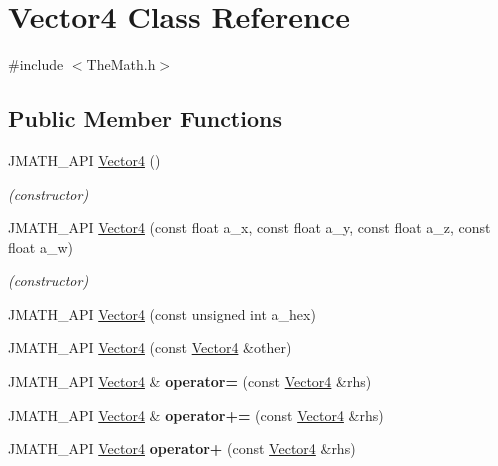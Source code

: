 \hypertarget{class_vector4}{\section{Vector4 Class Reference}
\label{class_vector4}
}


{\ttfamily \#include $<$The\+Math.\+h$>$}

\subsection*{Public Member Functions}
\begin{DoxyCompactItemize}
\item 
J\+M\+A\+T\+H\+\_\+\+A\+P\+I \hyperlink{class_vector4_a511b4d9c8326c235b76d794eea018921}{Vector4} ()
\begin{DoxyCompactList}\small\item\em (constructor) \end{DoxyCompactList}\item 
J\+M\+A\+T\+H\+\_\+\+A\+P\+I \hyperlink{class_vector4_a56a3f858547873f05b8fed5cf58f3c85}{Vector4} (const float a\+\_\+x, const float a\+\_\+y, const float a\+\_\+z, const float a\+\_\+w)
\begin{DoxyCompactList}\small\item\em (constructor) \end{DoxyCompactList}\item 
J\+M\+A\+T\+H\+\_\+\+A\+P\+I \hyperlink{class_vector4_a72cd9aad753aa48673375a33a2e87849}{Vector4} (const unsigned int a\+\_\+hex)
\item 
J\+M\+A\+T\+H\+\_\+\+A\+P\+I \hyperlink{class_vector4_a5e32a459d47c732d9218a7967327007b}{Vector4} (const \hyperlink{class_vector4}{Vector4} \&other)
\item 
\hypertarget{class_vector4_a41f905001671d932b8477a5eda4b1cdd}{J\+M\+A\+T\+H\+\_\+\+A\+P\+I \hyperlink{class_vector4}{Vector4} \& {\bfseries operator=} (const \hyperlink{class_vector4}{Vector4} \&rhs)}\label{class_vector4_a41f905001671d932b8477a5eda4b1cdd}

\item 
\hypertarget{class_vector4_a0300961141ded6c7a7a49ae5455597ec}{J\+M\+A\+T\+H\+\_\+\+A\+P\+I \hyperlink{class_vector4}{Vector4} \& {\bfseries operator+=} (const \hyperlink{class_vector4}{Vector4} \&rhs)}\label{class_vector4_a0300961141ded6c7a7a49ae5455597ec}

\item 
\hypertarget{class_vector4_afa160ed9d724f642666dd79dbe9e53ad}{J\+M\+A\+T\+H\+\_\+\+A\+P\+I \hyperlink{class_vector4}{Vector4} {\bfseries operator+} (const \hyperlink{class_vector4}{Vector4} \&rhs)}\label{class_vector4_afa160ed9d724f642666dd79dbe9e53ad}


\end{DoxyCompactItemize}
